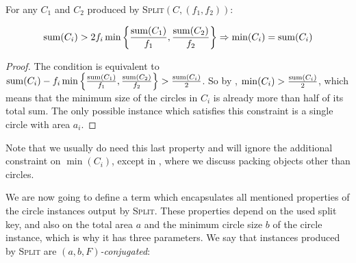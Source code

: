 \documentclass[a4paper,style=print,oneside,bibliography=totoc,nexus,lnum,extramargin]{tubsbook}
\begin{document}
\begin{lemma}\label{th:min2}
    For any $C_1$ and $C_2$ produced by \textsc{Split}$(C,(f_1,f_2))$:

    $$\operatorname{sum}(C_i) > 2f_i\min\left\{\frac{\operatorname{sum}(C_1)}{f_1},\frac{\operatorname{sum}(C_2)}{f_2}\right\} \Rightarrow \min(C_i) = \operatorname{sum}(C_i)$$
\end{lemma}

\begin{proof}
    The condition is equivalent to $\operatorname{sum}(C_i) - f_i\min\left\{\frac{\operatorname{sum}(C_1)}{f_1},\frac{\operatorname{sum}(C_2)}{f_2}\right\} > \frac{\operatorname{sum}(C_i)}{2}$. So by , $\min(C_i) > \frac{\operatorname{sum}(C_i)}{2}$, which means that the minimum size of the circles in $C_i$ is already more than half of its total sum. The only possible instance which satisfies this constraint is a single circle with area $a_i$.

\end{proof}

Note that we usually do need this last property and will ignore the additional constraint on $\min(C_i)$, except in , where we discuss packing objects other than circles.

We are now going to define a term which encapsulates all mentioned properties of the circle instances output by \textsc{Split}. These properties depend on the used split key, and also on the total area $a$ and the minimum circle size $b$ of the circle instance, which is why it has three parameters. We say that instances produced by \textsc{Split} are \emph{$(a,b,F)$-conjugated}:

\end{document}
